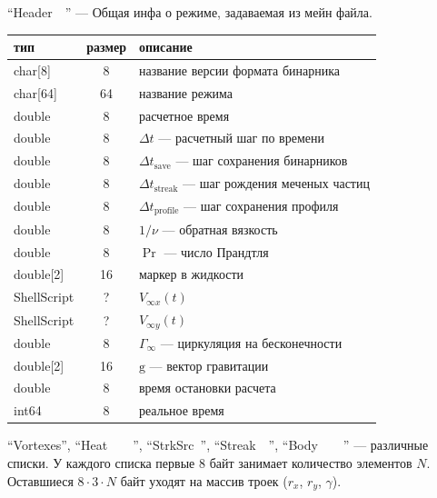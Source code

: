 \documentclass[a4paper,14pt]{extreport}
\newcommand{\br}[1]{\boldsymbol{\mathrm{#1}}}
\renewcommand{\vec}[1]{\br{#1}}
\begin{document}
``Header~~'' --- Общая инфа о режиме, задаваемая из мейн файла.\\
\begin{tabular}{lcl}
тип & размер & описание\\\hline
char[8]      & 8  & название версии формата бинарника\\
char[64]     & 64 & название режима\\
double       & 8  & расчетное время\\
double       & 8  & $\Delta t$ --- расчетный шаг по времени\\
double       & 8  & $\Delta t_\text{save}$ --- шаг сохранения бинарников\\
double       & 8  & $\Delta t_\text{streak}$ --- шаг рождения меченых частиц\\
double       & 8  & $\Delta t_\text{profile}$ --- шаг сохранения профиля\\
double       & 8  & $1/\nu$ --- обратная вязкость\\
double       & 8  & $\Pr$ --- число Прандтля\\
double[2]    & 16 & маркер в жидкости\\
ShellScript  & ?  & $V_{\infty x} (t)$\\
ShellScript  & ?  & $V_{\infty y} (t)$\\
double       & 8  & $\Gamma_\infty$ --- циркуляция на бесконечности\\
double[2]    & 16 & $\vec g$ --- вектор гравитации\\
double       & 8  & время остановки расчета\\
int64        & 8  & реальное время\\
\hline
\end{tabular}

``Vortexes'', ``Heat~~~~'', ``StrkSrc~'', ``Streak~~'', ``Body~~~~'' --- различные списки. У каждого списка первые 8 байт занимает количество элементов $N$. Оставшиеся $8\cdot 3 \cdot N$ байт уходят на массив троек ($r_x$, $r_y$, $\gamma$).
\end{document}
